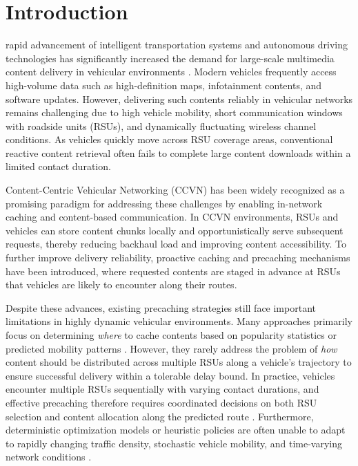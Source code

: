 \section{Introduction}
 rapid advancement of intelligent transportation systems and autonomous driving technologies has significantly increased the demand for large-scale multimedia content delivery in vehicular environments \cite{Autonomous, ITS}. 
Modern vehicles frequently access high-volume data such as high-definition maps, infotainment contents, and software updates\cite{VehicularApplication, InfotainmentServicesContent}. 
However, delivering such contents reliably in vehicular networks remains challenging due to high vehicle mobility, short communication windows with roadside units (RSUs), and dynamically fluctuating wireless channel conditions\cite{VehicularNetworkDynamics}. 
As vehicles quickly move across RSU coverage areas, conventional reactive content retrieval often fails to complete large content downloads within a limited contact duration\cite{RSU}.

Content-Centric Vehicular Networking (CCVN) has been widely recognized as a promising paradigm for addressing these challenges by enabling in-network caching and content-based communication\cite{CCVN}. 
In CCVN environments, RSUs and vehicles can store content chunks locally and opportunistically serve subsequent requests, thereby reducing backhaul load and improving content accessibility\cite{CCVNCaching, ICNEfficientCaching}. 
To further improve delivery reliability, proactive caching and precaching mechanisms have been introduced, where requested contents are staged in advance at RSUs that vehicles are likely to encounter along their routes\cite{Demand, Popularity2, MobilityAwareEdgeCaching, LargeFileMobilityCaching, Nam}.

Despite these advances, existing precaching strategies still face important limitations in highly dynamic vehicular environments. 
Many approaches primarily focus on determining \emph{where} to cache contents based on popularity statistics or predicted mobility patterns \cite{PopularityValueRetrieval, UAVEdgeCachingPopularity, CoPUP, Seq2SeqPopularityCaching, VehiclesMobility, DSP2, LargeFileMobilityCaching}. 
However, they rarely address the problem of \emph{how} content should be distributed across multiple RSUs along a vehicle's trajectory to ensure successful delivery within a tolerable delay bound. 
In practice, vehicles encounter multiple RSUs sequentially with varying contact durations, and effective precaching therefore requires coordinated decisions on both RSU selection and content allocation along the predicted route \cite{EdgeVCD, Nam}. 
Furthermore, deterministic optimization models  or heuristic policies are often unable to adapt to rapidly changing traffic density, stochastic vehicle mobility, and time-varying network conditions \cite{ProactiveContentCaching2016, EdgeVCD, AdaptiveContentPrecaching, ClairvoyantEdge, Nam}.


